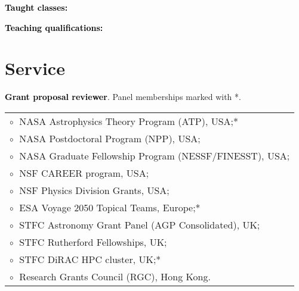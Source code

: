 \vspace{0.2cm}
\textbf{\textcolor{black}{Taught classes:}}\vspace{0.05cm}\\
\vspace{-0.1cm}
%
\vspace{-0.1cm}
%
 \vspace{-0.1cm}
%
\vspace{-0.1cm}
%



\vspace{0.2cm}
\textbf{\textcolor{black}{Teaching qualifications:}}\vspace{0.05cm}\\


\section{Service}

 \textbf{\textcolor{black}{Grant proposal reviewer}}. Panel memberships marked with *.\vspace{0.1cm}\\
\begin{tabular}{@{\hskip 0.4cm}l}
$\circ\;$ NASA Astrophysics Theory Program (ATP), USA;* \\
$\circ\;$ NASA Postdoctoral Program (NPP), USA;\\
$\circ\;$ NASA Graduate Fellowship Program (NESSF/FINESST), USA; \\
$\circ\;$ NSF CAREER program, USA;\\
$\circ\;$ NSF Physics Division Grants, USA;\\
$\circ\;$ ESA Voyage 2050 Topical Teams, Europe;* \\
$\circ\;$ STFC Astronomy Grant Panel (AGP Consolidated), UK;\\
$\circ\;$ STFC Rutherford Fellowships, UK;\\
$\circ\;$ STFC DiRAC HPC cluster, UK;*\\
$\circ\;$ Research Grants Council (RGC), Hong Kong.
\end{tabular}
\vspace{0.2cm}

